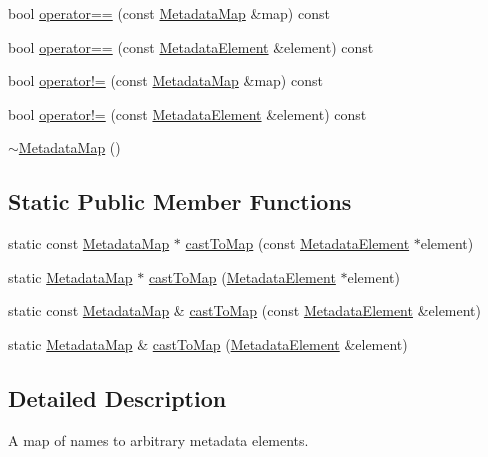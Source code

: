 \begin{DoxyCompactItemize}
\item 
bool \hyperlink{classBUSBOY_1_1MetadataMap_ae8a5e06c1baa5231744a7b98d49a37f7}{operator==} (const \hyperlink{classBUSBOY_1_1MetadataMap}{MetadataMap} \&map) const 
\item 
bool \hyperlink{classBUSBOY_1_1MetadataMap_a06e6202a354d6152e913470b815aa7e2}{operator==} (const \hyperlink{classBUSBOY_1_1MetadataElement}{MetadataElement} \&element) const 
\item 
bool \hyperlink{classBUSBOY_1_1MetadataMap_a161a2e429cc1b2fd40fac48222a9b90b}{operator!=} (const \hyperlink{classBUSBOY_1_1MetadataMap}{MetadataMap} \&map) const 
\item 
bool \hyperlink{classBUSBOY_1_1MetadataMap_a9b9921e4bdfb78c6ed3c30cbdcbdf640}{operator!=} (const \hyperlink{classBUSBOY_1_1MetadataElement}{MetadataElement} \&element) const 
\item 
\hyperlink{classBUSBOY_1_1MetadataMap_a8ddf080620bd9557052be4f69c41ca19}{$\sim$MetadataMap} ()
\end{DoxyCompactItemize}
\subsection*{Static Public Member Functions}
\begin{DoxyCompactItemize}
\item 
static const \hyperlink{classBUSBOY_1_1MetadataMap}{MetadataMap} $\ast$ \hyperlink{classBUSBOY_1_1MetadataMap_add9f26ea2cb4cc406f5683ed467e787e}{castToMap} (const \hyperlink{classBUSBOY_1_1MetadataElement}{MetadataElement} $\ast$element)
\item 
static \hyperlink{classBUSBOY_1_1MetadataMap}{MetadataMap} $\ast$ \hyperlink{classBUSBOY_1_1MetadataMap_a244835d85f8ef2062d630d1f03ca7b54}{castToMap} (\hyperlink{classBUSBOY_1_1MetadataElement}{MetadataElement} $\ast$element)
\item 
static const \hyperlink{classBUSBOY_1_1MetadataMap}{MetadataMap} \& \hyperlink{classBUSBOY_1_1MetadataMap_ae894474f65f24f7d1225588f63cadbf8}{castToMap} (const \hyperlink{classBUSBOY_1_1MetadataElement}{MetadataElement} \&element)
\item 
static \hyperlink{classBUSBOY_1_1MetadataMap}{MetadataMap} \& \hyperlink{classBUSBOY_1_1MetadataMap_a55e1c299d482e99d31fac7dbdb8ace62}{castToMap} (\hyperlink{classBUSBOY_1_1MetadataElement}{MetadataElement} \&element)
\end{DoxyCompactItemize}


\subsection{Detailed Description}
A map of names to arbitrary metadata elements. 

